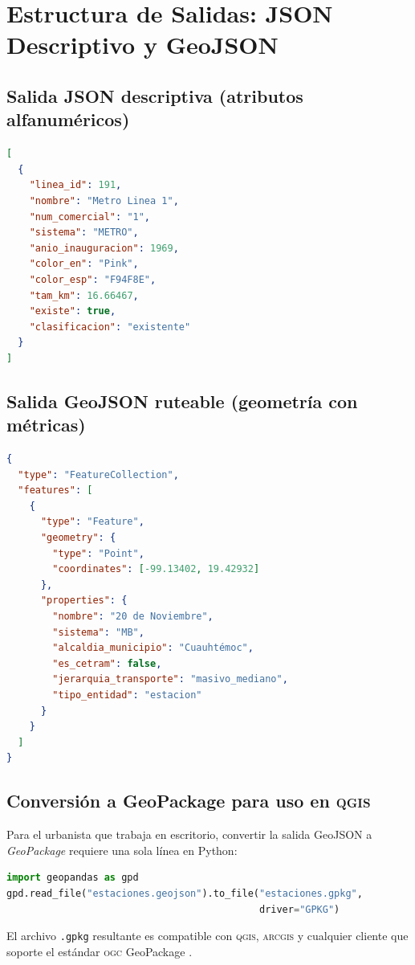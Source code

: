
\section{Estructura de Salidas: JSON Descriptivo y GeoJSON}
\label{anx:apimetro-salidas}

\subsection*{Salida JSON descriptiva (atributos alfanuméricos)}

\begin{lstlisting}[language=json,
    caption={Fragmento de salida JSON descriptiva para líneas de
             transporte.},
    label=lst:json-descriptivo]
[
  {
    "linea_id": 191,
    "nombre": "Metro Linea 1",
    "num_comercial": "1",
    "sistema": "METRO",
    "anio_inauguracion": 1969,
    "color_en": "Pink",
    "color_esp": "F94F8E",
    "tam_km": 16.66467,
    "existe": true,
    "clasificacion": "existente"
  }
]
\end{lstlisting}

\subsection*{Salida GeoJSON ruteable (geometría con métricas)}

\begin{lstlisting}[language=json,
    caption={Estructura GeoJSON ruteable de una estación en
             \texttt{Apimetro}.},
    label=lst:geojson-estacion]
{
  "type": "FeatureCollection",
  "features": [
    {
      "type": "Feature",
      "geometry": {
        "type": "Point",
        "coordinates": [-99.13402, 19.42932]
      },
      "properties": {
        "nombre": "20 de Noviembre",
        "sistema": "MB",
        "alcaldia_municipio": "Cuauhtémoc",
        "es_cetram": false,
        "jerarquia_transporte": "masivo_mediano",
        "tipo_entidad": "estacion"
      }
    }
  ]
}
\end{lstlisting}

\subsection*{Conversión a GeoPackage para uso en \textsc{qgis}}

Para el urbanista que trabaja en escritorio, convertir la salida GeoJSON a
\textit{GeoPackage} requiere una sola línea en Python:

\begin{lstlisting}[language=Python,
    caption={Conversión de GeoJSON a GeoPackage con \textit{GeoPandas}.},
    label=lst:geopandas-conversion]
import geopandas as gpd
gpd.read_file("estaciones.geojson").to_file("estaciones.gpkg",
                                            driver="GPKG")
\end{lstlisting}

El archivo \texttt{.gpkg} resultante es compatible con \textsc{qgis},
\textsc{arcgis} y cualquier cliente que soporte el estándar \textsc{ogc}
GeoPackage \citep{ogc2014geopackage}.
